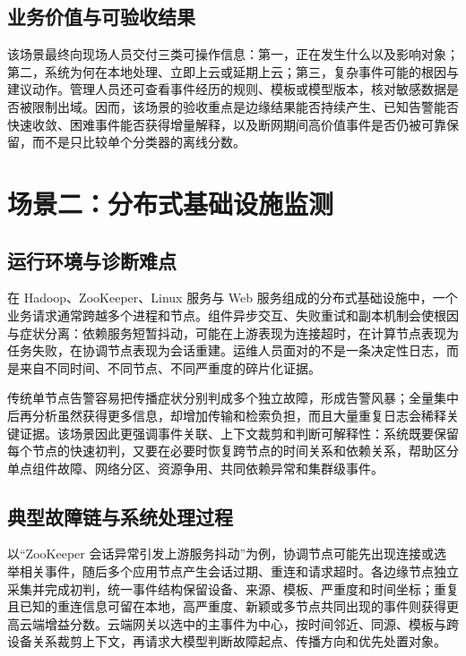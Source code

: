 \subsection{业务价值与可验收结果}

该场景最终向现场人员交付三类可操作信息：第一，正在发生什么以及影响对象；第二，系统为何在本地处理、立即上云或延期上云；第三，复杂事件可能的根因与建议动作。管理人员还可查看事件经历的规则、模板或模型版本，核对敏感数据是否被限制出域。因而，该场景的验收重点是边缘结果能否持续产生、已知告警能否快速收敛、困难事件能否获得增量解释，以及断网期间高价值事件是否仍被可靠保留，而不是只比较单个分类器的离线分数。

\section{场景二：分布式基础设施监测}

\subsection{运行环境与诊断难点}

在 Hadoop、ZooKeeper、Linux 服务与 Web 服务组成的分布式基础设施中，一个业务请求通常跨越多个进程和节点。组件异步交互、失败重试和副本机制会使根因与症状分离：依赖服务短暂抖动，可能在上游表现为连接超时，在计算节点表现为任务失败，在协调节点表现为会话重建。运维人员面对的不是一条决定性日志，而是来自不同时间、不同节点、不同严重度的碎片化证据。

传统单节点告警容易把传播症状分别判成多个独立故障，形成告警风暴；全量集中后再分析虽然获得更多信息，却增加传输和检索负担，而且大量重复日志会稀释关键证据。该场景因此更强调事件关联、上下文裁剪和判断可解释性：系统既要保留每个节点的快速初判，又要在必要时恢复跨节点的时间关系和依赖关系，帮助区分单点组件故障、网络分区、资源争用、共同依赖异常和集群级事件。

\subsection{典型故障链与系统处理过程}

以“ZooKeeper 会话异常引发上游服务抖动”为例，协调节点可能先出现连接或选举相关事件，随后多个应用节点产生会话过期、重连和请求超时。各边缘节点独立采集并完成初判，统一事件结构保留设备、来源、模板、严重度和时间坐标；重复且已知的重连信息可留在本地，高严重度、新颖或多节点共同出现的事件则获得更高云端增益分数。云端网关以选中的主事件为中心，按时间邻近、同源、模板与跨设备关系裁剪上下文，再请求大模型判断故障起点、传播方向和优先处置对象。

